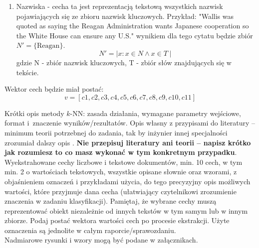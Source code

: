\documentclass{article}
\begin{document}
\begin{enumerate}
    \item Nazwiska - cecha ta jest reprezentacją tekstową wszystkich nazwisk pojawiających się ze zbioru nazwisk kluczowych. Przykład: "Wallis was quoted as saying the Reagan Administration wants Japanese cooperation so the White House can ensure any U.S." wynikiem dla tego cytatu będzie zbiór \( N' = \{ \text{Reagan} \} \).
    \begin{equation}
            N' =  \mid x : x \in N \land x \in T \mid
        \end{equation}
        gdzie N - zbiór nazwisk kluczowych, T - zbiór słów znajdujących się w tekście.
\end{enumerate}

Wektor cech będzie miał postać: 
        \begin{equation}
          v = [c1, c2, c3, c4, c5, c6, c7, c8, c9, c10, c11]
        \end{equation}

Krótki opis metody $k$-NN: zasada działania, wymagane parametry wejściowe, format
i~znaczenie wyników/rezultatów. Opis własny z przypisami do literatury -- minimum
teorii potrzebnej do zadania, tak by inżynier innej specjalności zrozumiał dalszy
opis \cite{tadeusiewicz90}. {\bf Nie przepisuj literatury ani teorii -- napisz krótko jak
rozumiesz to co masz wykonać w tym konkretnym przypadku}.\\

Wyekstrahowane cechy liczbowe i tekstowe dokumentów, min. 10 cech, w tym min. 2
o wartościach tekstowych, wszystkie
opisane słownie oraz wzorami, z objaśnieniem oznaczeń i przykładami użycia, do
tego precyzyjny opis możliwych wartości, które przyjmuje dana cecha (ułatwiający
czytelnikowi zrozumienie znaczenia w zadaniu klasyfikacji). Pamiętaj, że wybrane
cechy muszą reprezentować obiekt niezależnie od innych tekstów w tym samym lub w
innym zbiorze. Podaj postać wektora wartości cech po procesie ekstrakcji. Użyte oznaczenia są jednolite w całym
raporcie/sprawozdaniu. \\ 
\indent Nadmiarowe rysunki i wzory mogą być podane w załącznikach. \\
\end{document}
